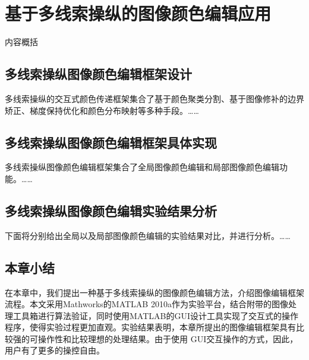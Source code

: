 \chapter{基于多线索操纵的图像颜色编辑应用}
内容概括 \cite{Zuo10}

\section{多线索操纵图像颜色编辑框架设计}
多线索操纵的交互式颜色传递框架集合了基于颜色聚类分割、基于图像修补的边界矫正、梯度保持优化和颜色分布映射等多种手段。……

\section{多线索操纵图像颜色编辑框架具体实现}
多线索操纵图像颜色编辑框架集合了全局图像颜色编辑和局部图像颜色编辑功能。……

\section{多线索操纵图像颜色编辑实验结果分析}
下面将分别给出全局以及局部图像颜色编辑的实验结果对比，并进行分析。……

\section{本章小结}
在本章中，我们提出一种基于多线索操纵的图像颜色编辑方法，介绍图像编辑框架流程。本文采用Mathworks的MATLAB 2010a作为实验平台，结合附带的图像处理工具箱进行算法验证，同时使用MATLAB的GUI设计工具实现了交互式的操作程序，使得实验过程更加直观。实验结果表明，本章所提出的图像编辑框架具有比较强的可操作性和比较理想的处理结果。由于使用 GUI交互操作的方式，因此，用户有了更多的操控自由。


